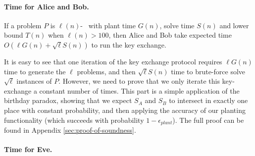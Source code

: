 \paragraph{Time for Alice and Bob.}

\begin{lemma}\label{lem:alice-bob-time}
	If a problem $P$ is $\ell(n)$-\keyER~ with plant time $G(n)$, solve time $S(n)$ and lower bound $T(n)$ when $\ell(n)>100$,
	then Alice and Bob take expected time $O(\ell G(n) + \sqrt{\ell} S(n))$ to run the key exchange.
\end{lemma}
\begin{proof-sketch}
	It is easy to see that one iteration of the key exchange protocol requires $\ell G(n)$ time to generate the $\ell$ problems, and then $\sqrt{\ell}S(n)$ time to brute-force solve $\sqrt{\ell}$ instances of $P$. However, we need to prove that we only iterate this key-exchange a constant number of times. This part is a simple application of the birthday paradox, showing that we expect $S_A$ and $S_B$ to intersect in exactly one place with constant probability, and then applying the accuracy of our planting functionality (which succeeds with probability $1 - \epsilon_{plant}$).
	The full proof can be found in Appendix \ref{sec:proof-of-soundness}.
\end{proof-sketch}

\paragraph{Time for Eve.}

